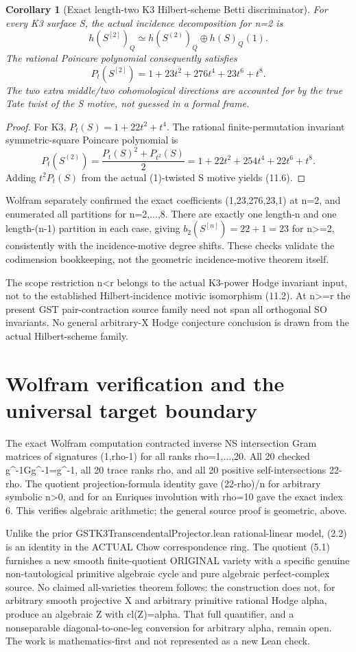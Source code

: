 \documentclass[11pt]{article}
\newtheorem{corollary}[theorem]{Corollary}
\begin{document}
\begin{corollary}[Exact length-two K3 Hilbert-scheme Betti discriminator]
For every K3 surface S, the
actual incidence decomposition
for n=2 is
\[
 h(S^{[2]})_Q
   \simeq h(S^{(2)})_Q
                     \oplus h(S)_Q(1).
\]
The rational Poincare polynomial
consequently satisfies
\[
 \boxed{
 P_t(S^{[2]})
    =1+23t^2+276t^4+23t^6+t^8 .}                  \tag{11.6}
\]
The two extra middle/two
cohomological directions
are accounted for by the true
Tate twist of the S motive,
not guessed in a formal frame.
\end{corollary}
\begin{proof}
For K3,
\(P_t(S)=1+22t^2+t^4\).
The rational finite-permutation
invariant symmetric-square
Poincare polynomial is
\[
 P_t(S^{(2)})=
   \frac{P_t(S)^2+P_{t^2}(S)}2
 =1+22t^2+254t^4+22t^6+t^8 .
\]
Adding \(t^2P_t(S)\) from
the actual (1)-twisted
S motive yields (11.6).
\end{proof}

Wolfram separately confirmed
the exact coefficients
(1,23,276,23,1) at n=2,
and enumerated all partitions
for n=2,...,8. There are
exactly one length-n and
one length-(n-1)
partition in each case, giving
\(b_2(S^{[n]})=22+1=23\)
for n>=2, consistently with
the incidence-motive
degree shifts. These checks
validate the codimension
bookkeeping, not the geometric
incidence-motive theorem itself.

The scope restriction n<r
belongs to the actual K3-power
Hodge invariant input,
not to the established
Hilbert-incidence motivic
isomorphism (11.2).
At n>=r the present GST
pair-contraction source
family need not span all
orthogonal SO invariants.
No general arbitrary-X
Hodge conjecture conclusion
is drawn from the actual
Hilbert-scheme family.

\section{Wolfram verification and the universal target boundary}
The exact Wolfram computation contracted inverse
NS intersection Gram matrices of signatures
(1,rho-1) for all ranks rho=1,...,20.
All 20 checked g^{-1}Gg^{-1}=g^{-1},
all 20 trace ranks rho, and all 20
positive self-intersections 22-rho.
The quotient projection-formula identity
gave (22-rho)/n for arbitrary symbolic n>0,
and for an Enriques involution with rho=10
gave the exact index 6.
This verifies algebraic arithmetic; the
general source proof is geometric, above.

Unlike the prior GSTK3TranscendentalProjector.lean
rational-linear model, (2.2) is an identity
in the ACTUAL Chow correspondence ring.
The quotient (5.1) furnishes a new smooth
finite-quotient ORIGINAL variety with a specific
genuine non-tautological primitive algebraic
cycle and pure algebraic perfect-complex source.
No claimed all-varieties theorem follows:
the construction does not, for arbitrary
smooth projective X and arbitrary primitive
rational Hodge alpha, produce an algebraic
Z with cl(Z)=alpha. That full quantifier,
and a nonseparable diagonal-to-one-leg
conversion for arbitrary alpha, remain open.
The work is mathematics-first and
not represented as a new Lean check.
\end{document}
